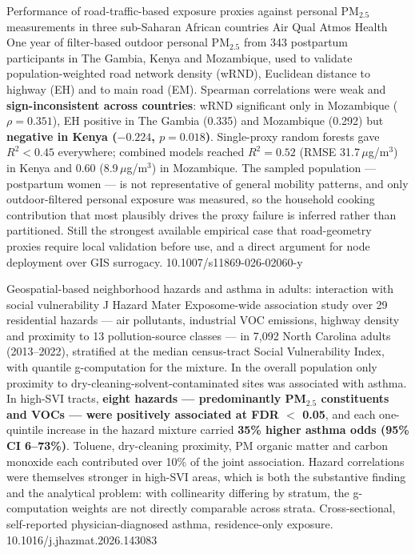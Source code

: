 \documentclass[10pt]{article}
\begin{document}
{Performance of road-traffic-based exposure proxies against personal PM$_{2.5}$
measurements in three sub-Saharan African countries}
{Air Qual Atmos Health}
{One year of filter-based outdoor personal PM$_{2.5}$ from 343 postpartum participants in
The Gambia, Kenya and Mozambique, used to validate population-weighted road network
density (wRND), Euclidean distance to highway (EH) and to main road (EM). Spearman
correlations were weak and \textbf{sign-inconsistent across countries}: wRND significant
only in Mozambique ($\rho = 0.351$), EH positive in The Gambia (0.335) and Mozambique
(0.292) but \textbf{negative in Kenya ($-0.224$, $p = 0.018$)}. Single-proxy random
forests gave $R^2 < 0.45$ everywhere; combined models reached $R^2 = 0.52$
(RMSE 31.7\,$\mu$g/m$^3$) in Kenya and 0.60 (8.9\,$\mu$g/m$^3$) in Mozambique. The
sampled population --- postpartum women --- is not representative of general mobility
patterns, and only outdoor-filtered personal exposure was measured, so the household
cooking contribution that most plausibly drives the proxy failure is inferred rather than
partitioned. Still the strongest available empirical case that road-geometry proxies
require local validation before use, and a direct argument for node deployment over GIS
surrogacy.}
{10.1007/s11869-026-02060-y}

{Geospatial-based neighborhood hazards and asthma in adults: interaction with social
vulnerability}
{J Hazard Mater}
{Exposome-wide association study over 29 residential hazards --- air pollutants,
industrial VOC emissions, highway density and proximity to 13 pollution-source classes
--- in 7,092 North Carolina adults (2013--2022), stratified at the median census-tract
Social Vulnerability Index, with quantile g-computation for the mixture. In the overall
population only proximity to dry-cleaning-solvent-contaminated sites was associated with
asthma. In high-SVI tracts, \textbf{eight hazards --- predominantly PM$_{2.5}$
constituents and VOCs --- were positively associated at FDR $<$ 0.05}, and each
one-quintile increase in the hazard mixture carried \textbf{35\% higher asthma odds
(95\% CI 6--73\%)}. Toluene, dry-cleaning proximity, PM organic matter and carbon
monoxide each contributed over 10\% of the joint association. Hazard correlations were
themselves stronger in high-SVI areas, which is both the substantive finding and the
analytical problem: with collinearity differing by stratum, the g-computation weights are
not directly comparable across strata. Cross-sectional, self-reported
physician-diagnosed asthma, residence-only exposure.}
{10.1016/j.jhazmat.2026.143083}
\end{document}
